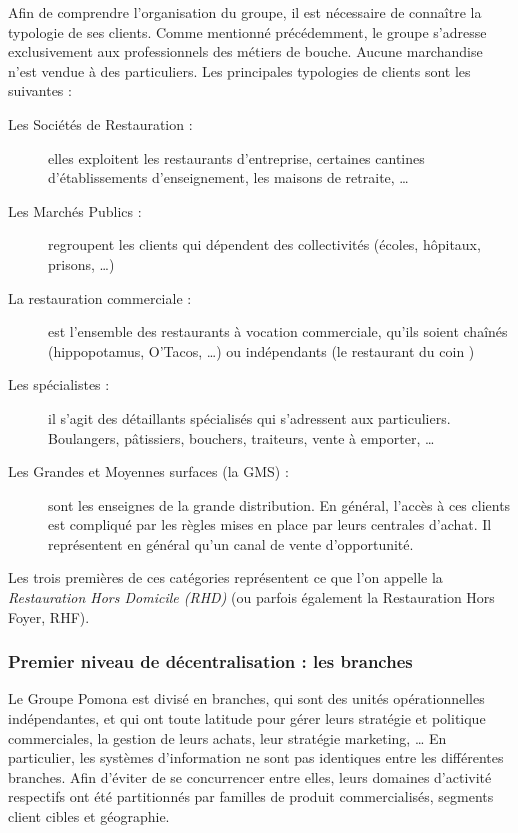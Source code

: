             Afin de comprendre l'organisation du groupe, il est nécessaire de connaître la typologie de ses clients.
            Comme mentionné précédemment, le groupe s'adresse exclusivement aux professionnels des métiers de bouche.
            Aucune marchandise n'est vendue à des particuliers.
            Les principales typologies de clients sont les suivantes : 
            \begin{description}
                \item[Les Sociétés de Restauration :] elles exploitent les restaurants d'entreprise, certaines cantines d'établissements d'enseignement, les maisons de retraite, \dots
                \item[Les Marchés Publics :] regroupent les clients qui dépendent des collectivités (écoles, hôpitaux, prisons, \dots)
                \item[La restauration commerciale :] est l'ensemble des restaurants à vocation commerciale, qu'ils soient chaînés (hippopotamus, O'Tacos, \dots) ou indépendants (\og le restaurant du coin \fg)
                \item[Les spécialistes :] il s'agit des détaillants spécialisés qui s'adressent aux particuliers. Boulangers, pâtissiers, bouchers, traiteurs, vente à emporter, \dots
                \item[Les Grandes et Moyennes surfaces (la GMS) :] sont les enseignes de la grande distribution. En général, l'accès à ces clients est compliqué par les règles mises en place par leurs centrales d'achat. Il représentent en général qu'un canal de vente d'opportunité.
            \end{description}

            Les trois premières de ces catégories représentent ce que l'on appelle la \emph{Restauration Hors Domicile (RHD)} (ou parfois également la Restauration Hors Foyer, RHF).

            \subsubsection{Premier niveau de décentralisation : les branches}
            \label{les_branches}
            Le Groupe Pomona est divisé en branches, qui sont des unités opérationnelles indépendantes, et qui ont toute latitude pour gérer leurs stratégie et politique commerciales, la gestion de leurs achats, leur stratégie marketing, \dots
            En particulier, les systèmes d'information ne sont pas identiques entre les différentes branches.
            Afin d'éviter de se concurrencer entre elles, leurs domaines d'activité respectifs ont été partitionnés par familles de produit commercialisés, segments client cibles et géographie. 

